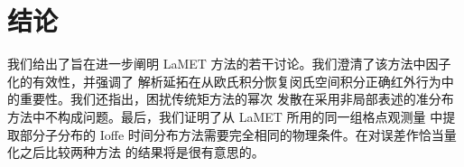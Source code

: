 \section{结论}

我们给出了旨在进一步阐明 LaMET 方法的若干讨论。我们澄清了该方法中因子化的有效性，并强调了
解析延拓在从欧氏积分恢复闵氏空间积分正确红外行为中的重要性。我们还指出，困扰传统矩方法的幂次
发散在采用非局部表述的准分布方法中不构成问题。最后，我们证明了从 LaMET 所用的同一组格点观测量
中提取部分子分布的 Ioffe 时间分布方法需要完全相同的物理条件。在对误差作恰当量化之后比较两种方法
的结果将是很有意思的。
